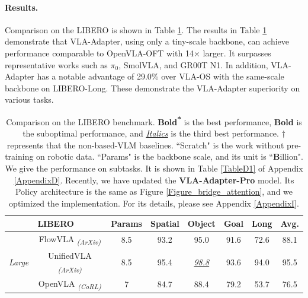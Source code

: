 \paragraph{Results.} Comparison on the LIBERO is shown in Table \ref{ComparisonLIBERO}. The results in Table \ref{ComparisonLIBERO} demonstrate that VLA-Adapter, using only a tiny-scale backbone, can achieve performance comparable to OpenVLA-OFT with 14$\times$ larger. It surpasses representative works such as $\pi_0$, SmolVLA, and GR00T N1. In addition, VLA-Adapter has a notable advantage of 29.0\% over VLA-OS with the same-scale backbone on LIBERO-Long. These demonstrate the VLA-Adapter superiority on various tasks.

\begin{table}[t]
    \centering
    \small
    \setlength{\tabcolsep}{2mm}
    \caption{Comparison on the LIBERO benchmark. \textbf{Bold\textsuperscript{*}} is the best performance, \textbf{Bold} is the suboptimal performance, and \underline{\textit{Italics}} is the third best performance. $\dag$ represents that the non-based-VLM baselines. ``Scratch" is the work without pre-training on robotic data. ``Params" is the backbone scale, and its unit is ``\textbf{B}illion". We give the performance on subtasks. It is shown in Table \ref{TableD1} of Appendix \ref{AppendixD}. Recently, we have updated the \textbf{VLA-Adapter-Pro} model. Its Policy architecture is the same as Figure \ref{Figure_bridge_attention}, and we optimized the implementation. For its details, please see Appendix \ref{AppendixI}.}\label{ComparisonLIBERO}
	\begin{tabular}{ccc|cccc|c}
		\toprule[1pt]
		\multicolumn{2}{c}{LIBERO} &Params& \multicolumn{1}{c}{Spatial} & \multicolumn{1}{c}{Object} & \multicolumn{1}{c}{Goal} & \multicolumn{1}{c|}{Long} & \multicolumn{1}{c}{Avg.} \\
		\midrule[0.5pt]
		\multirow{11}{*}{\textit{Large}}&FlowVLA \citep{FlowVLA-2025} \textsubscript{\textit{(ArXiv)}}&8.5&93.2 &95.0 &91.6 &72.6& 88.1\\
        &UnifiedVLA \citep{UnifiedVLA-2025} \textsubscript{\textit{(ArXiv)}}&8.5 & \multicolumn{1}{c}{95.4} & \multicolumn{1}{c}{\underline{\textit{98.8}}} & \multicolumn{1}{c}{93.6} & \multicolumn{1}{c|}{94.0} & \multicolumn{1}{c}{95.5} \\
        &OpenVLA \citep{OpenVLA-2024} \textsubscript{\textit{(CoRL)}}&7 & \multicolumn{1}{c}{84.7} & \multicolumn{1}{c}{88.4} & \multicolumn{1}{c}{79.2} & \multicolumn{1}{c|}{53.7} & \multicolumn{1}{c}{76.5} \\

\end{tabular}
\end{table}
